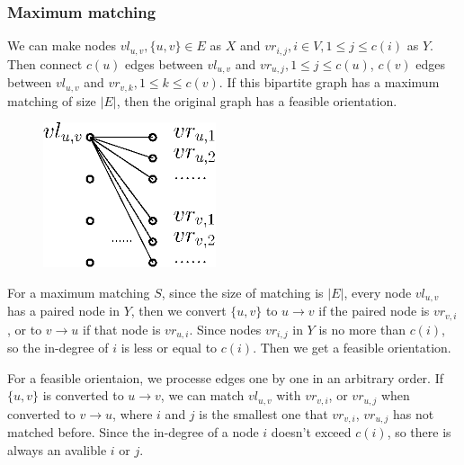 		\subsubsection*{Maximum matching}
			We can make nodes $vl_{u,v},\{u,v\}\in E$ as $X$ and $vr_{i,j},i\in V,1\leq j\leq c(i)$ as $Y$. Then connect $c(u)$ edges between $vl_{u, v}$ and $vr_{u,j},1\leq j\leq c(u)$, $c(v)$ edges between $vl_{u, v}$ and $vr_{v,k},1\leq k\leq c(v)$. If this bipartite graph has a maximum matching of size $|E|$, then the original graph has a feasible orientation.\par
			\begin{figure}[H]
				\centering\includegraphics[width=2in]{source/qwd/qb.eps}
			\end{figure}
			For a maximum matching $S$, since the size of matching is $|E|$, every node $vl_{u, v}$ has a paired node in $Y$, then we convert $\{u, v\}$ to $u\to v$ if the paired node is $vr_{v,i}$, or to $v\to u$ if that node is $vr_{u,i}$. Since nodes $vr_{i, j}$ in $Y$ is no more than $c(i)$, so the in-degree of $i$ is less or equal to $c(i)$. Then we get a feasible orientation.\par
			For a feasible orientaion, we processe edges one by one in an arbitrary order. If $\{u, v\}$ is converted to $u\to v$, we can match $vl_{u, v}$ with $vr_{v, i}$, or $vr_{u, j}$ when converted to $v\to u$, where $i$ and $j$ is the smallest one that $vr_{v, i}$, $vr_{u, j}$ has not matched before. Since the in-degree of a node $i$ doesn't exceed $c(i)$, so there is always an avalible $i$ or $j$.

